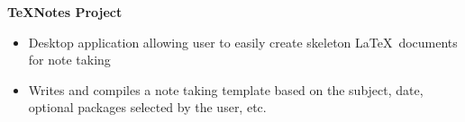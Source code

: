\documentclass[11pt]{article}
\begin{document}
\vspace{3pt}

\textbf{TeXNotes Project}
\begin{itemize}
    \item Desktop application allowing user to easily create skeleton \LaTeX\ documents for note taking
    \item Writes and compiles a note taking template based on the subject, date, optional packages selected by the user, etc. 
\end{itemize}
\end{document}
